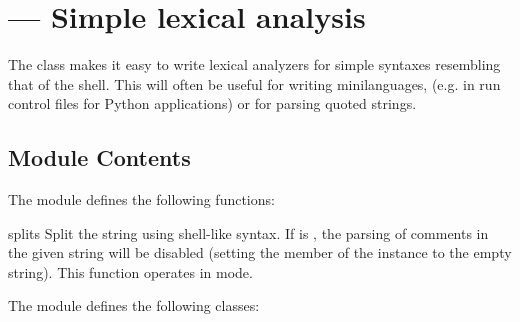 \section{ ---
         Simple lexical analysis}



The  class makes it easy to write lexical analyzers for
simple syntaxes resembling that of the \UNIX{} shell.  This will often
be useful for writing minilanguages, (e.g. in run control files for
Python applications) or for parsing quoted strings.

\begin{seealso}
\end{seealso}


\subsection{Module Contents}

The  module defines the following functions:

\begin{funcdesc}{split}{s}
Split the string  using shell-like syntax. If  is
, the parsing of comments in the given string will be
disabled (setting the  member of the 
instance to the empty string). This function operates in \POSIX{} mode.
\end{funcdesc}

The  module defines the following classes:

